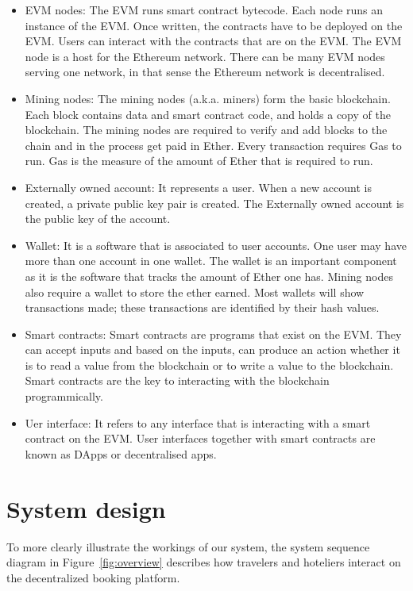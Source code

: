 \documentclass{KERauth}
\begin{document}
\begin{itemize}
    \item EVM nodes: The EVM runs smart contract bytecode. Each node runs an instance of the EVM. Once written, the contracts have to be deployed on the EVM. Users can interact with the contracts that are on the EVM. The EVM node is a host for the Ethereum network. There can be many EVM nodes serving one network, in that sense the Ethereum network is decentralised.
    \item Mining nodes: The mining nodes (a.k.a. miners) form the basic blockchain. Each block contains data and smart contract code, and holds a copy of the blockchain. The mining nodes are required to verify and add blocks to the chain and in the process get paid in Ether. Every transaction requires Gas to run. Gas is the measure of the amount of Ether that is required to run.
    \item Externally owned account: It represents a user. When a new account is created, a private public key pair is created. The Externally owned account is the public key of the account.
    \item Wallet: It is a software that is associated to user accounts. One user may have more than one account in one wallet. The wallet is an important component as it is the software that tracks the amount of Ether one has. Mining nodes also require a wallet to store the ether earned. Most wallets will show transactions made; these transactions are identified by their hash values.
    \item Smart contracts: Smart contracts are programs that exist on the EVM. They can accept inputs and based on the inputs, can produce an action whether it is to read a value from the blockchain or to write a value to the blockchain. Smart contracts are the key to interacting with the blockchain programmically.
    \item Uer interface: It refers to any interface that is interacting with a smart contract on the EVM. User interfaces together with smart contracts are known as DApps or decentralised apps.
\end{itemize}


\section{System design}

To more clearly illustrate the workings of our system, the system sequence diagram in Figure~\ref{fig:overview} describes
how travelers and hoteliers interact on the decentralized booking platform.
\end{document}
